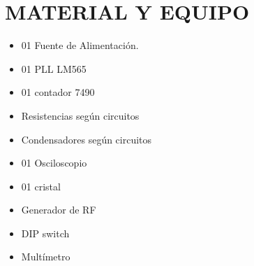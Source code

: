 \section{MATERIAL Y EQUIPO}

\begin{itemize}
    \item 01 Fuente de Alimentación.
    \item 01 PLL LM565
    \item 01 contador 7490
    \item Resistencias según circuitos
    \item Condensadores según circuitos
    \item 01 Osciloscopio
    \item 01 cristal
    \item Generador de RF
    \item DIP switch
    \item Multímetro
\end{itemize}
